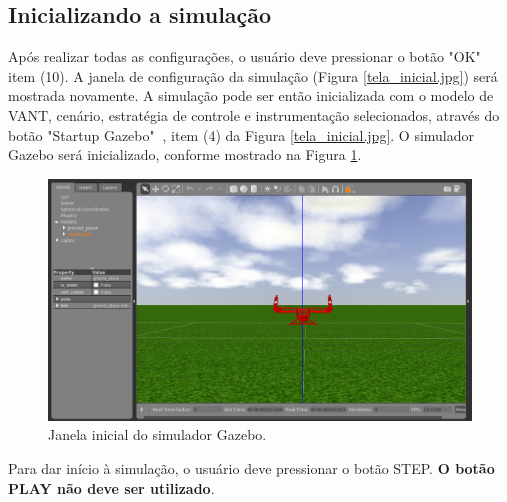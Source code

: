 \subsection{Inicializando a simulação}

Após realizar todas as configurações, o usuário deve pressionar o botão "OK" $~$ item (10). A janela de configuração da simulação (Figura \ref{tela_inicial.jpg}) será mostrada novamente. A simulação pode ser então inicializada com o modelo de VANT, cenário, estratégia de controle e instrumentação selecionados, através do botão "Startup Gazebo" $~$, item (4) da Figura \ref{tela_inicial.jpg}. O simulador Gazebo será inicializado, conforme mostrado na Figura \ref{12}. 



\begin{figure}[!ht]
	\centering
	\includegraphics[width=400pt]{figuras/12.png}
	\caption{Janela inicial do simulador Gazebo.}
	\label{12}
\end{figure}

Para dar início à simulação, o usuário deve pressionar o botão STEP. \textbf{O botão PLAY não deve ser utilizado}.